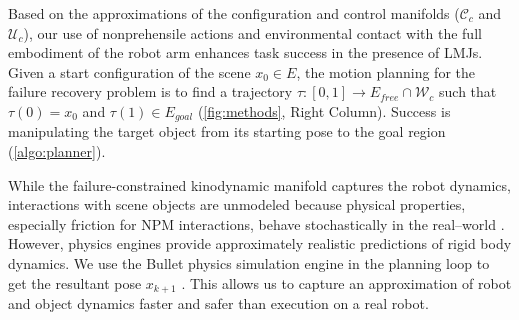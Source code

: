 
Based on the approximations of the configuration and control manifolds ($\mathcal{C}_c$ and $\mathcal{U}_c$), our use of nonprehensile actions and environmental contact with the full embodiment of the robot arm enhances task success in the presence of LMJs.
Given a start configuration of the scene $x_0 \in E$, the motion planning for the failure recovery problem is to find a trajectory $\tau: [0, 1] \rightarrow E_{free} \cap \mathcal{W}_c$ such that $\tau(0) = x_0$ and $\tau(1) \in E_{goal}$ (\cref{fig:methods}, Right Column). Success is manipulating the target object from its starting pose to the goal region (\cref{algo:planner}).

While the failure-constrained kinodynamic manifold captures the robot dynamics, interactions with scene objects are unmodeled because physical properties, especially friction for NPM interactions, behave stochastically in the real--world \cite{ALBERTINI2021104242}. However, physics engines provide approximately realistic predictions of rigid body dynamics. We use the Bullet physics simulation engine in the planning loop to get the resultant pose $x_{k+1}$ \cite{coumans2021}.  This allows us to capture an approximation of robot and object dynamics faster and safer than execution on a real robot. 

